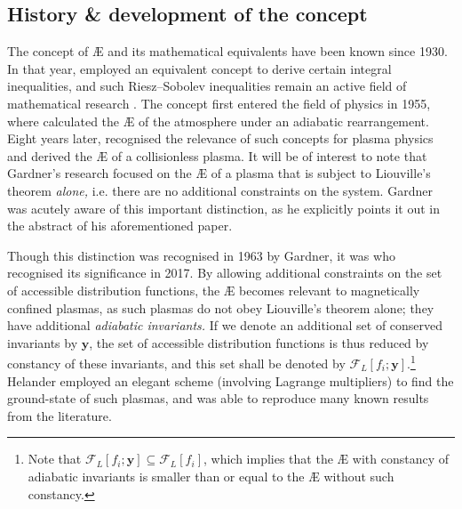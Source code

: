 \subsection*{History \& development of the concept}
The concept of \AE{} and its mathematical equivalents have been known since 1930. In that year, \citet{riesz1930inegalite} employed an equivalent concept to derive certain integral inequalities, and such Riesz–Sobolev inequalities remain an active field of mathematical research \cite{burchard1996cases,burchard2006rearrangement,hajaiej2011necessity,carlen2017stability,frank2019proof}. The concept first entered the field of physics in 1955, where \citet{lorenz1955available} calculated the \AE{} of the atmosphere under an adiabatic rearrangement. Eight years later, \citet{gardner1963bound} recognised the relevance of such concepts for plasma physics and derived the \AE{} of a collisionless plasma. It will be of interest to note that Gardner's research focused on the \AE{} of a plasma that is subject to Liouville's theorem {\it alone,} i.e. there are no additional constraints on the system. Gardner was acutely aware of this important distinction, as he explicitly points it out in the abstract of his aforementioned paper. \par 
Though this distinction was recognised in 1963 by Gardner, it was \citet{helander2017available,helander2020available} who recognised its significance in 2017. By allowing additional constraints on the set of accessible distribution functions, the \AE{} becomes relevant to magnetically confined plasmas, as such plasmas do not obey Liouville's theorem alone; they have additional {\it adiabatic invariants.} If we denote an additional set of conserved invariants by $\boldsymbol{y}$, the set of accessible distribution functions is thus reduced by constancy of these invariants, and this set shall be denoted by $\mathcal{F}_L[f_i;\boldsymbol{y}]$.\footnote{Note that $\mathcal{F}_L[f_i;\boldsymbol{y}] \subseteq \mathcal{F}_L[f_i]$, which implies that the \AE{} with constancy of adiabatic invariants is smaller than or equal to the \AE{} without such constancy.} Helander employed an elegant scheme (involving Lagrange multipliers) to find the ground-state of such plasmas, and was able to reproduce many known results from the literature. \par 
